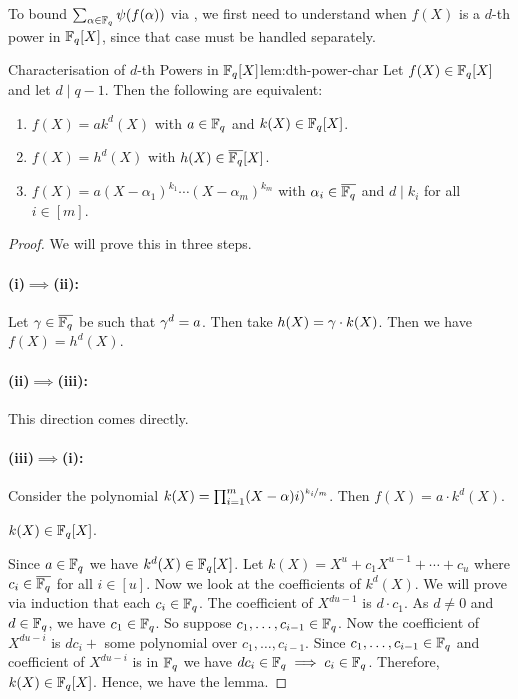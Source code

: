 To bound $\sum_{\alpha\in\mathbb{F}_q}\psi(f(\alpha))$ via \Stepanov, we first need to understand when $f(X)$ is a $d$-th power in $\mathbb{F}_q[X]$, since that case must be handled separately.
\begin{lemma}{Characterisation of $d$-th Powers in $\mathbb{F}_q[X]$}{lem:dth-power-char}
  Let $f(X)\in\mathbb{F}_q[X]$ and let $d\mid q-1$. Then the following are equivalent:
  \begin{enumerate}[label=(\roman*)]
    \item $f(X)=ak^d(X)$ with $a\in\mathbb{F}_q$ and $k(X)\in\mathbb{F}_q[X]$.
    \item $f(X)=h^d(X)$ with $h(X)\in\overline{\mathbb{F}_q}[X]$.
    \item $f(X)=a(X-\alpha_1)^{k_1}\cdots (X-\alpha_m)^{k_m}$ with $\alpha_i\in\overline{\mathbb{F}_q}$ and $d\mid k_i$ for all $i\in[m]$.
  \end{enumerate}
\end{lemma}
\begin{proof}
  We will prove this in three steps. 
  \paragraph*{(i)$\implies$(ii):} Let $\gamma\in\overline{\mathbb{F}_q}$ be such that $\gamma^d=a$. Then take $h(X)=\gamma\cdot k(X)$. Then we have $f(X)=h^d(X)$. 
  \paragraph*{(ii)$\implies $(iii):} This direction comes directly. 
  \paragraph*{(iii)$\implies$(i):} Consider the polynomial $k(X)=\prod_{i=1}^m(X-\alpha)i)^{\nicefrac{k_i}m}$. Then $f(X)=a\cdot k^d(X)$. 
  
  \begin{enough}
    $k(X)\in\mathbb{F}_q[X]$. 
  \end{enough}
  Since $a\in\mathbb{F}_q$ we have $k^d(X)\in\mathbb{F}_q[X]$. Let $k(X)=X^u+c_1X^{u-1}+\cdots +c_u$ where $c_i\in\overline{\mathbb{F}_q}$ for all $i\in[u]$. Now we look at the coefficients of $k^d(X)$. We will prove via induction that each $c_i\in\mathbb{F}_q$. The coefficient of $X^{du-1}$ is $d\cdot c_1$. As $d\neq 0$ and $d\in\mathbb{F}_q$, we have $c_1\in\mathbb{F}_q$. So suppose $c_1,\dots, c_{i-1}\in\mathbb{F}_q$. Now the coefficient of $X^{du-i}$ is $dc_i+$ some polynomial over $c_1,\dots, c_{i-1}$. Since $c_1,\dots, c_{i-1}\in \mathbb{F}_q$ and coefficient of $X^{du-i}$ is in $\mathbb{F}_q$ we have $dc_i\in\mathbb{F}_q\implies c_i\in \mathbb{F}_q$. Therefore, $k(X)\in\mathbb{F}_q[X]$. Hence, we have the lemma.
\end{proof}

